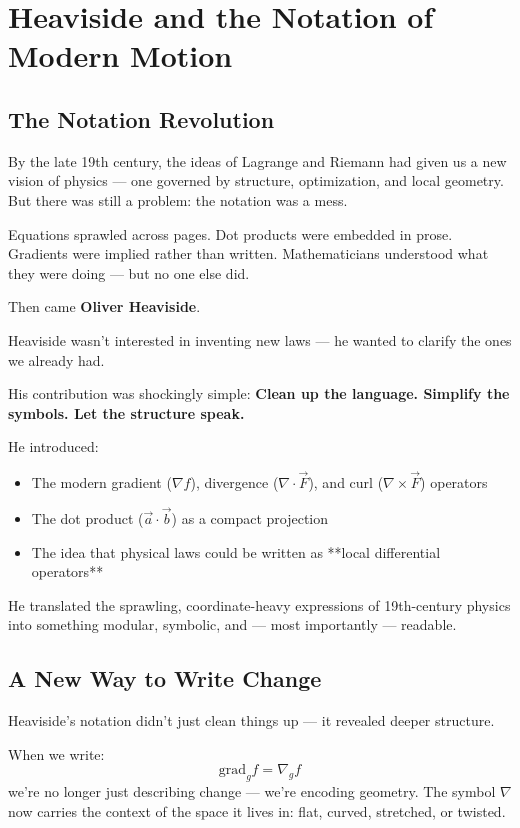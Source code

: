 \section{Heaviside and the Notation of Modern Motion}

\subsection{The Notation Revolution}

By the late 19th century, the ideas of Lagrange and Riemann had given us a new vision of physics — one governed by structure, optimization, and local geometry.  
But there was still a problem: the notation was a mess.

Equations sprawled across pages. Dot products were embedded in prose. Gradients were implied rather than written. Mathematicians understood what they were doing — but no one else did.

Then came \textbf{Oliver Heaviside}.

Heaviside wasn’t interested in inventing new laws — he wanted to clarify the ones we already had.

His contribution was shockingly simple:  \textbf{Clean up the language. Simplify the symbols. Let the structure speak.}

He introduced:

\begin{itemize}
    \item The modern gradient (\( \nabla f \)), divergence (\( \nabla \cdot \vec{F} \)), and curl (\( \nabla \times \vec{F} \)) operators
    \item The dot product (\( \vec{a} \cdot \vec{b} \)) as a compact projection
    \item The idea that physical laws could be written as **local differential operators**
\end{itemize}

He translated the sprawling, coordinate-heavy expressions of 19th-century physics into something modular, symbolic, and — most importantly — readable.

\subsection{A New Way to Write Change}

Heaviside’s notation didn’t just clean things up — it revealed deeper structure.

When we write:
\[
\text{grad}_g f = \nabla_g f
\]
we’re no longer just describing change — we’re encoding geometry. The symbol \( \nabla \) now carries the context of the space it lives in: flat, curved, stretched, or twisted.

